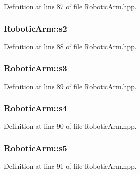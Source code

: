 Definition at line 87 of file Robotic\+Arm.\+hpp.

\subsubsection[{\texorpdfstring{s2}{s2}}]{ Robotic\+Arm\+::s2}\hypertarget{class_robotic_arm_aeafd57f690026379493f193d94bd8210}{}\label{class_robotic_arm_aeafd57f690026379493f193d94bd8210}


Definition at line 88 of file Robotic\+Arm.\+hpp.

\subsubsection[{\texorpdfstring{s3}{s3}}]{ Robotic\+Arm\+::s3}\hypertarget{class_robotic_arm_a9241e65a54080f2f642bd08a78a12f6f}{}\label{class_robotic_arm_a9241e65a54080f2f642bd08a78a12f6f}


Definition at line 89 of file Robotic\+Arm.\+hpp.

\subsubsection[{\texorpdfstring{s4}{s4}}]{ Robotic\+Arm\+::s4}\hypertarget{class_robotic_arm_af0d9eb18ff10b252b79c8a986fe31170}{}\label{class_robotic_arm_af0d9eb18ff10b252b79c8a986fe31170}


Definition at line 90 of file Robotic\+Arm.\+hpp.

\subsubsection[{\texorpdfstring{s5}{s5}}]{ Robotic\+Arm\+::s5}\hypertarget{class_robotic_arm_a393711dcc74eb1fba3f9e544cd2bb771}{}\label{class_robotic_arm_a393711dcc74eb1fba3f9e544cd2bb771}


Definition at line 91 of file Robotic\+Arm.\+hpp.

